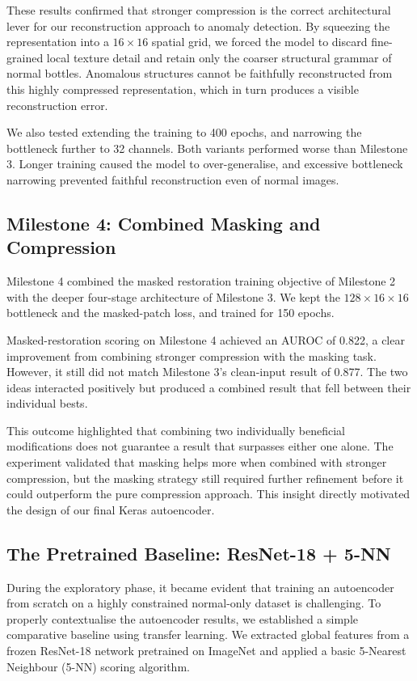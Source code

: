 \documentclass[11pt, a4paper]{article}
\begin{document}
These results confirmed that stronger compression is the correct architectural lever for our reconstruction approach to anomaly detection. By squeezing the representation into a $16 \times 16$ spatial grid, we forced the model to discard fine-grained local texture detail and retain only the coarser structural grammar of normal bottles. Anomalous structures cannot be faithfully reconstructed from this highly compressed representation, which in turn produces a visible reconstruction error.

We also tested extending the training to 400 epochs, and narrowing the bottleneck further to 32 channels. Both variants performed worse than Milestone 3. Longer training caused the model to over-generalise, and excessive bottleneck narrowing prevented faithful reconstruction even of normal images.

\subsection{Milestone 4: Combined Masking and Compression}
\label{sec:ae4}

Milestone 4 combined the masked restoration training objective of Milestone 2 with the deeper four-stage architecture of Milestone 3. We kept the $128 \times 16 \times 16$ bottleneck and the masked-patch loss, and trained for 150 epochs.

Masked-restoration scoring on Milestone 4 achieved an AUROC of 0.822, a clear improvement from combining stronger compression with the masking task. However, it still did not match Milestone 3's clean-input result of 0.877. The two ideas interacted positively but produced a combined result that fell between their individual bests.

This outcome highlighted that combining two individually beneficial modifications does not guarantee a result that surpasses either one alone. The experiment validated that masking helps more when combined with stronger compression, but the masking strategy still required further refinement before it could outperform the pure compression approach. This insight directly motivated the design of our final Keras autoencoder.


\subsection{The Pretrained Baseline: ResNet-18 + 5-NN}
\label{sec:ali_baseline}

During the exploratory phase, it became evident that training an autoencoder from scratch on a highly constrained normal-only dataset is challenging. To properly contextualise the autoencoder results, we established a simple comparative baseline using transfer learning. We extracted global features from a frozen ResNet-18 network pretrained on ImageNet and applied a basic 5-Nearest Neighbour (5-NN) scoring algorithm. 
\end{document}
